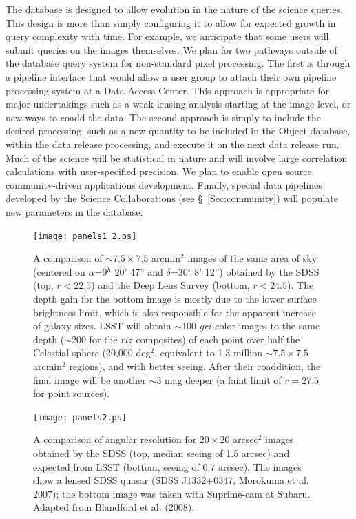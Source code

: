 \documentclass{emulateapj}
\begin{document}
The database is designed to allow evolution in the nature of the science queries. 
This design is more than simply configuring it
to allow for expected growth in query complexity with time. For
example, we anticipate that some users will submit queries on the images 
themselves. We plan for two pathways outside of the database query system
for non-standard pixel processing. The first is through a pipeline interface
that would allow a user group to attach their own pipeline processing system
at a Data Access Center. This approach is appropriate for major undertakings 
such as a weak lensing analysis starting at the image level,
or new ways to coadd the data. The second approach is simply to include the 
desired processing, such as a new quantity to be included in the Object database, 
within the data release processing, and execute it on the next data release 
run. Much of the science will be statistical in nature and will involve large 
correlation calculations with user-specified precision. We plan to enable
open source community-driven applications development. Finally, special data 
pipelines developed by the Science Collaborations (see \S~\ref{Sec:community}) 
will populate new parameters in the database. 



\begin{figure}
\hskip -0.8in
\texttt{[image: panels1\_2.ps]}
\caption{A comparison of $\sim7.5\times7.5$ arcmin$^2$ images of
the same area of sky (centered on $\alpha$=9$^h$ 20' 47'' and 
$\delta$=30$^\circ$ 8' 12'') obtained by the SDSS (top, $r<22.5$) and 
the Deep Lens Survey (bottom, $r<24.5$). The depth gain for the bottom image
is mostly due to the lower surface brightness limit, which is also responsible 
for the apparent increase of galaxy sizes. LSST will obtain $\sim$100 $gri$ 
color images to the same depth ($\sim$200 for the $riz$ composites) of each point 
over half the Celestial sphere (20,000 deg$^2$, equivalent to 1.3 million $\sim7.5\times7.5$
arcmin$^2$ regions), and with better seeing. After their coaddition, the final 
image will be another $\sim3$ mag deeper (a faint limit of $r=27.5$ for point 
sources).} 
\label{Fig:panels1}
\end{figure}

\begin{figure}
\texttt{[image: panels2.ps]}
\caption{A comparison of angular resolution for $20\times20$ arcsec$^2$ images obtained 
by the SDSS (top, median seeing of 1.5 arcsec) and expected from LSST (bottom,
seeing of 0.7 arcsec). The images show a lensed SDSS quasar (SDSS J1332+0347,
Morokuma et al. 2007); the bottom image was taken with Suprime-cam at Subaru. 
Adapted from Blandford et al. (2008).} 
\label{Fig:panels2}
\end{figure}
\end{document}
